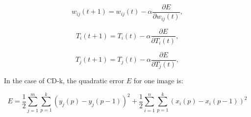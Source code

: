 \begin{equation}
w_{ij}(t+1)=w_{ij}(t)-\alpha\frac{\partial E}{\partial w_{ij}(t)},
\end{equation}

\begin{equation}
T_{i}(t+1)=T_{i}(t)-\alpha\frac{\partial E}{\partial T_{i}(t)},
\end{equation}

\begin{equation}
T_{j}(t+1)=T_{j}(t)-\alpha\frac{\partial E}{\partial T_{j}(t)},
\end{equation}

In the case of CD-k, the quadratic error $E$ for one image is:

\begin{equation*}
E=\frac{1}{2}\sum_{j=1}^m\sum_{p=1}^k (y_j(p)-y_j(p-1))^2+\frac{1}{2}\sum_{i=1}^n\sum_{p=1}^k (x_i(p)-x_i(p-1))^2
\end{equation*}


